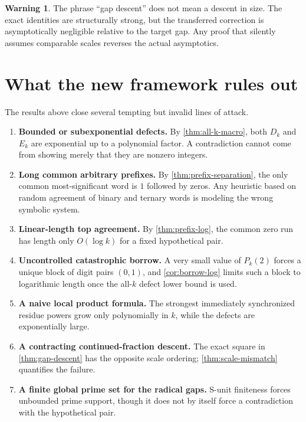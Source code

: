 \documentclass[11pt]{article}
\theoremstyle{definition}
\newtheorem{warning}[theorem]{Warning}
\begin{document}
\begin{warning}
The phrase ``gap descent'' does not mean a descent in size.  The exact
identities are structurally strong, but the transferred correction is
asymptotically negligible relative to the target gap.  Any proof that
silently assumes comparable scales reverses the actual asymptotics.
\end{warning}

\section{What the new framework rules out}
\label{sec:nogo}

The results above close several tempting but invalid lines of attack.

\begin{enumerate}
\item \textbf{Bounded or subexponential defects.}
By \cref{thm:all-k-macro}, both \(D_k\) and \(E_k\) are exponential up to a
polynomial factor.  A contradiction cannot come from showing merely that
they are nonzero integers.

\item \textbf{Long common arbitrary prefixes.}
By \cref{thm:prefix-separation}, the only common most-significant word is
\(1\) followed by zeros.  Any heuristic based on random agreement of
binary and ternary words is modeling the wrong symbolic system.

\item \textbf{Linear-length top agreement.}
By \cref{thm:prefix-log}, the common zero run has length only
\(O(\log k)\) for a fixed hypothetical pair.

\item \textbf{Uncontrolled catastrophic borrow.}
A very small value of \(P_k(2)\) forces a unique block of digit pairs
\((0,1)\), and \cref{cor:borrow-log} limits such a block to logarithmic
length once the all-\(k\) defect lower bound is used.

\item \textbf{A naive local product formula.}
The strongest immediately synchronized residue powers grow only
polynomially in \(k\), while the defects are exponentially large.

\item \textbf{A contracting continued-fraction descent.}
The exact square in \cref{thm:gap-descent} has the opposite scale ordering;
\cref{thm:scale-mismatch} quantifies the failure.

\item \textbf{A finite global prime set for the radical gaps.}
S-unit finiteness forces unbounded prime support, though it does not by
itself force a contradiction with the hypothetical pair.
\end{enumerate}
\end{document}
